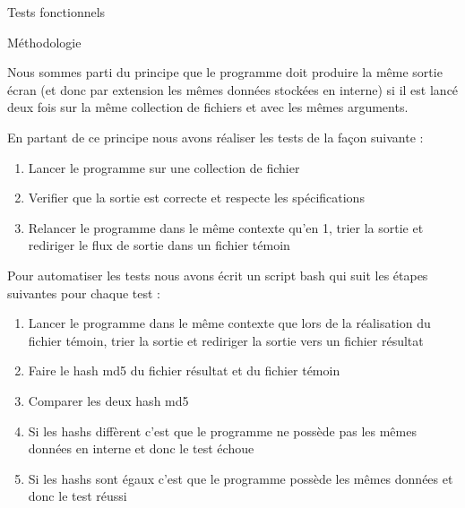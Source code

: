 \documentclass{article}
\begin{document}
\begin{section}{Tests fonctionnels}

 \begin{subsection}{Méthodologie}
  
    Nous sommes parti du principe que le programme doit produire la même sortie écran (et donc par extension les mêmes données stockées en interne)
    si il est lancé deux fois sur la même collection de fichiers et avec les mêmes arguments.

    En partant de ce principe nous avons réaliser les tests de la façon suivante : 

    \begin{enumerate}
      \item Lancer le programme sur une collection de fichier
      \item Verifier que la sortie est correcte et respecte les spécifications
      \item Relancer le programme dans le même contexte qu'en 1, trier la sortie et rediriger le flux de sortie dans un fichier témoin
    \end{enumerate}

    Pour automatiser les tests nous avons écrit un script bash qui suit les étapes suivantes pour chaque test :
  
    \begin{enumerate}
      \item Lancer le programme dans le même contexte que lors de la réalisation du fichier témoin, trier la sortie et rediriger la sortie vers un fichier résultat
      \item Faire le hash md5 du fichier résultat et du fichier témoin
      \item Comparer les deux hash md5
      \item Si les hashs diffèrent c'est que le programme ne possède pas les mêmes données en interne et donc le test échoue
      \item Si les hashs sont égaux c'est que le programme possède les mêmes données et donc le test réussi
    \end{enumerate}

 \end{subsection}





\end{section}
\end{document}
